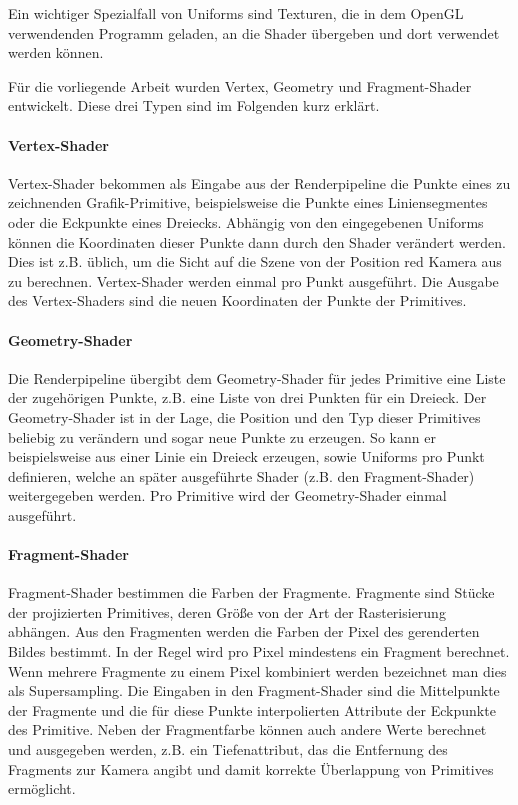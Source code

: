 \documentclass[a4paper,fontsize=12pt,toc=bib,parskip=half,ngerman]{scrartcl}
\begin{document}
Ein wichtiger Spezialfall von Uniforms sind Texturen, die in dem OpenGL verwendenden Programm geladen, an die Shader \"ubergeben und dort verwendet werden k\"onnen.

F\"ur die vorliegende Arbeit wurden Vertex, Geometry und Fragment-Shader entwickelt. Diese drei Typen sind im Folgenden kurz erkl\"art.

\paragraph{Vertex-Shader}
Vertex-Shader bekommen als Eingabe aus der Renderpipeline die Punkte eines zu zeichnenden Grafik-Primitive, beispielsweise die Punkte eines Liniensegmentes oder die Eckpunkte eines Dreiecks. Abh\"angig von den eingegebenen Uniforms k\"onnen die Koordinaten dieser Punkte dann durch den Shader ver\"andert werden. Dies ist z.B. \"ublich, um die Sicht auf die Szene von der Position red Kamera aus zu berechnen. Vertex-Shader werden einmal pro Punkt ausgef\"uhrt. Die Ausgabe des Vertex-Shaders sind die neuen Koordinaten der Punkte der Primitives.

\paragraph{Geometry-Shader}
Die Renderpipeline \"ubergibt dem Geometry-Shader f\"ur jedes Primitive eine Liste der zugeh\"origen Punkte, z.B. eine Liste von drei Punkten f\"ur ein Dreieck. Der Geometry-Shader ist in der Lage, die Position und den Typ dieser Primitives beliebig zu ver\"andern und sogar neue Punkte zu erzeugen. So kann er beispielsweise aus einer Linie ein Dreieck erzeugen, sowie Uniforms pro Punkt definieren, welche an sp\"ater ausgef\"uhrte Shader (z.B. den Fragment-Shader) weitergegeben werden. Pro Primitive wird der Geometry-Shader einmal ausgef\"uhrt.

\paragraph{Fragment-Shader}
Fragment-Shader bestimmen die Farben der Fragmente. Fragmente sind St\"ucke der projizierten Primitives, deren Gr\"o{\ss}e von der Art der Rasterisierung abh\"angen. Aus den Fragmenten werden die Farben der Pixel des gerenderten Bildes bestimmt. In der Regel wird pro Pixel mindestens ein Fragment berechnet. Wenn mehrere Fragmente zu einem Pixel kombiniert werden bezeichnet man dies als Supersampling. Die Eingaben in den Fragment-Shader sind die Mittelpunkte der Fragmente und die f\"ur diese Punkte interpolierten Attribute der Eckpunkte des Primitive. Neben der Fragmentfarbe k\"onnen auch andere Werte berechnet und ausgegeben werden, z.B. ein Tiefenattribut, das die Entfernung des Fragments zur Kamera angibt und damit korrekte \"Uberlappung von Primitives erm\"oglicht.
\end{document}
